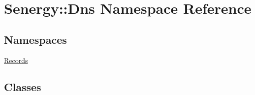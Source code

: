 \hypertarget{namespace_senergy_1_1_dns}{\section{Senergy\-:\-:Dns Namespace Reference}
\label{namespace_senergy_1_1_dns}
}
\subsection*{Namespaces}
\begin{DoxyCompactItemize}
\item 
\hyperlink{namespace_senergy_1_1_dns_1_1_records}{Records}
\end{DoxyCompactItemize}
\subsection*{Classes}
